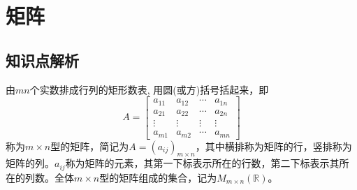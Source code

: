 \chapter{矩阵}

\section{知识点解析}

\begin{Def}
由$mn$个实数排成行列的矩形数表, 用圆(或方)括号括起来，即
$$A = \begin{bmatrix}
a_{11} & a_{12} & \cdots & a_{1n} \\ a_{21} & a_{22} & \cdots & a_{2n} \\ \vdots & \vdots & \vdots & \vdots \\ a_{m1} & a_{m2} & \cdots & a_{mn}
\end{bmatrix}$$
称为$m\times n$型的矩阵，简记为$A = (a_{ij})_{m\times n}$，其中横排称为矩阵的行，竖排称为矩阵的列。$a_{ij}$称为矩阵的元素，其第一下标表示所在的行数，第二下标表示其所在的列数。全体$m\times n$型的矩阵组成的集合，记为$M_{m\times n}(\mathbb{R})$。
\end{Def}

